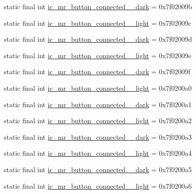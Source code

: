 \begin{CompactItemize}
\item 
static final int \hyperlink{classandroid_1_1support_1_1v4_1_1_r_1_1drawable_5d5e9af58f64c0243c8ae7de30d3764e}{ic\_\-mr\_\-button\_\-connected\_\_\-dark} = 0x7f02009b
\item 
static final int \hyperlink{classandroid_1_1support_1_1v4_1_1_r_1_1drawable_71860ff3914c325a056da830f120ca44}{ic\_\-mr\_\-button\_\-connected\_\_\-light} = 0x7f02009c
\item 
static final int \hyperlink{classandroid_1_1support_1_1v4_1_1_r_1_1drawable_9fc10d1e33d677646293a80d35096037}{ic\_\-mr\_\-button\_\-connected\_\_\-dark} = 0x7f02009d
\item 
static final int \hyperlink{classandroid_1_1support_1_1v4_1_1_r_1_1drawable_b5577d82cb29f4f5857890ed67400fd9}{ic\_\-mr\_\-button\_\-connected\_\_\-light} = 0x7f02009e
\item 
static final int \hyperlink{classandroid_1_1support_1_1v4_1_1_r_1_1drawable_b23b41768300e6883243159e6de583dd}{ic\_\-mr\_\-button\_\-connected\_\_\-dark} = 0x7f02009f
\item 
static final int \hyperlink{classandroid_1_1support_1_1v4_1_1_r_1_1drawable_97a0202de3511b8c73469965664bd144}{ic\_\-mr\_\-button\_\-connected\_\_\-light} = 0x7f0200a0
\item 
static final int \hyperlink{classandroid_1_1support_1_1v4_1_1_r_1_1drawable_f3cdc0c3db3448c1bc448d93bcb30421}{ic\_\-mr\_\-button\_\-connected\_\_\-dark} = 0x7f0200a1
\item 
static final int \hyperlink{classandroid_1_1support_1_1v4_1_1_r_1_1drawable_8af1d5646cf2d0db64040b6a8464dae9}{ic\_\-mr\_\-button\_\-connected\_\_\-light} = 0x7f0200a2
\item 
static final int \hyperlink{classandroid_1_1support_1_1v4_1_1_r_1_1drawable_7c61989486305a1789a2639b1f214f31}{ic\_\-mr\_\-button\_\-connected\_\_\-dark} = 0x7f0200a3
\item 
static final int \hyperlink{classandroid_1_1support_1_1v4_1_1_r_1_1drawable_75363b379866c2bf86d1cb6fde9e68ad}{ic\_\-mr\_\-button\_\-connected\_\_\-light} = 0x7f0200a4
\item 
static final int \hyperlink{classandroid_1_1support_1_1v4_1_1_r_1_1drawable_ca66f38db82a3288838e1bcee9d94c3b}{ic\_\-mr\_\-button\_\-connected\_\_\-dark} = 0x7f0200a5
\item 
static final int \hyperlink{classandroid_1_1support_1_1v4_1_1_r_1_1drawable_ac86fd34654cda27abc747c9a8adca02}{ic\_\-mr\_\-button\_\-connected\_\_\-light} = 0x7f0200a6

\end{CompactItemize}
